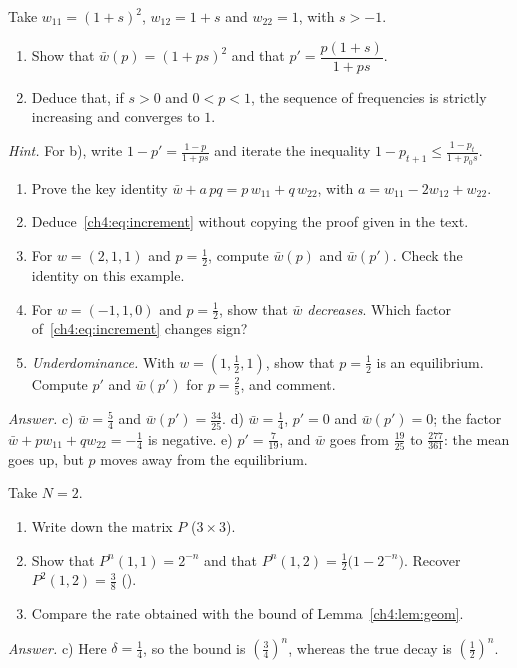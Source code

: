 \begin{exercise}
Take $w_{11}=(1+s)^2$, $w_{12}=1+s$ and $w_{22}=1$, with $s>-1$.
\begin{enumerate}[label=\alph*),itemsep=0pt]
\item Show that $\bar w(p)=(1+ps)^2$ and that $p'=\dfrac{p(1+s)}{1+ps}$.
\item Deduce that, if $s>0$ and $0<p<1$, the sequence of frequencies is strictly increasing and converges to
$1$.
\end{enumerate}
\emph{Hint.} For b), write $1-p'=\frac{1-p}{1+ps}$ and iterate the inequality $1-p_{t+1}\le\frac{1-p_t}{1+p_0s}$.
\end{exercise}

\begin{exercise}\label{ch4:ex:increment}
\begin{enumerate}[label=\alph*),itemsep=0pt]
\item Prove the key identity $\bar w+a\,pq=p\,w_{11}+q\,w_{22}$, with $a=w_{11}-2w_{12}+w_{22}$.
\item Deduce~\eqref{ch4:eq:increment} without copying the proof given in the text.
\item For $w=(2,1,1)$ and $p=\frac12$, compute $\bar w(p)$ and $\bar w(p')$. Check the identity on this example.
\item For $w=(-1,1,0)$ and $p=\frac12$, show that $\bar w$ \emph{decreases}. Which factor
of~\eqref{ch4:eq:increment} changes sign?
\item \emph{Underdominance.} With $w=(1,\frac12,1)$, show that $p=\frac12$ is an equilibrium. Compute $p'$ and
$\bar w(p')$ for $p=\frac25$, and comment.
\end{enumerate}
\emph{Answer.} c) $\bar w=\frac54$ and $\bar w(p')=\frac{34}{25}$. d) $\bar w=\frac14$, $p'=0$ and $\bar w(p')=0$;
the factor $\bar w+pw_{11}+qw_{22}=-\frac14$ is negative. e) $p'=\frac7{19}$, and $\bar w$ goes from $\frac{19}{25}$
to $\frac{277}{361}$: the mean goes up, but $p$ moves away from the equilibrium.
\end{exercise}

\begin{exercise}\label{ch4:ex:wf2}
Take $N=2$.
\begin{enumerate}[label=\alph*),itemsep=0pt]
\item Write down the matrix $P$ ($3\times3$).
\item Show that $P^n(1,1)=2^{-n}$ and that $P^n(1,2)=\frac12\bigl(1-2^{-n}\bigr)$. Recover $P^2(1,2)=\frac38$
().
\item Compare the rate obtained with the bound of Lemma~\ref{ch4:lem:geom}.
\end{enumerate}
\emph{Answer.} c) Here $\delta=\frac14$, so the bound is $(\frac34)^n$, whereas the true decay is
$(\frac12)^n$.
\end{exercise}

